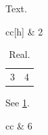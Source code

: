 \documentclass{aastex701}
\begin{document}
Text.
\begin{deluxetable}{cc}[h]
 & 2 \\
\enddata
\end{deluxetable}
\begin{table}
\caption{Real.}\label{r}
\begin{tabular}{cc}3&4\end{tabular}
\end{table}
See \ref{r}.
\begin{deluxetable}{cc}
 & 6 \\
\enddata
\end{deluxetable}
\end{document}
